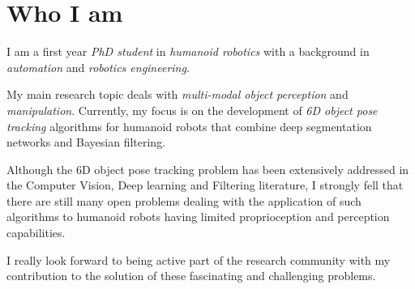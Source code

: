 \documentclass[11pt,a4paper,sans]{moderncv}        %
\begin{document}
\makecvtitle

\section{\textbf{Who I am}}
I am a first year \emph{PhD student} in \emph{humanoid robotics} with a background in \emph{automation} and \emph{robotics engineering}.
\par
My main research topic deals with \emph{multi-modal object perception} and \emph{manipulation}. Currently, my focus is on the development of \emph{6D object pose tracking} algorithms for humanoid robots that combine deep segmentation networks and Bayesian filtering.
\par
Although the 6D object pose tracking problem has been extensively addressed in the Computer Vision, Deep learning and Filtering literature, I strongly fell that there are still many open problems dealing with the application of such algorithms to humanoid robots having limited proprioception and perception capabilities.
\par
I really look forward to being active part of the research community with my contribution to the solution of these fascinating and challenging problems.
\end{document}
